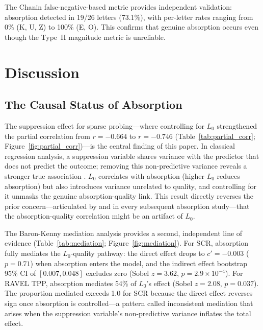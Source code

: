 \documentclass{article}
\begin{document}
The Chanin false-negative-based metric provides independent validation: absorption detected in 19/26 letters (73.1\%), with per-letter rates ranging from 0\% (K, U, Z) to 100\% (E, O).
This confirms that genuine absorption occurs even though the Type~II magnitude metric is unreliable.

\section{Discussion}
\label{sec:discussion}

\subsection{The Causal Status of Absorption}

The suppression effect for sparse probing---where controlling for $L_0$ strengthened the partial correlation from $r = -0.664$ to $r = -0.746$ (Table~\ref{tab:partial_corr}; Figure~\ref{fig:partial_corr})---is the central finding of this paper.
In classical regression analysis, a suppression variable shares variance with the predictor that does not predict the outcome; removing this non-predictive variance reveals a stronger true association \citep{conger1974revised}.
$L_0$ correlates with absorption (higher $L_0$ reduces absorption) but also introduces variance unrelated to quality, and controlling for it unmasks the genuine absorption-quality link.
This result directly reverses the prior concern---articulated by \citet{chanin2024absorption} and in every subsequent absorption study---that the absorption-quality correlation might be an artifact of $L_0$.

The Baron-Kenny mediation analysis provides a second, independent line of evidence (Table~\ref{tab:mediation}; Figure~\ref{fig:mediation}).
For SCR, absorption fully mediates the $L_0$-quality pathway: the direct effect drops to $c' = -0.003$ ($p = 0.71$) when absorption enters the model, and the indirect effect bootstrap 95\% CI of $[0.007, 0.048]$ excludes zero (Sobel $z = 3.62$, $p = 2.9 \times 10^{-4}$).
For RAVEL TPP, absorption mediates 54\% of $L_0$'s effect (Sobel $z = 2.08$, $p = 0.037$).
The proportion mediated exceeds 1.0 for SCR because the direct effect reverses sign once absorption is controlled---a pattern called inconsistent mediation \citep{mackinnon2007mediation} that arises when the suppression variable's non-predictive variance inflates the total effect.
\end{document}
